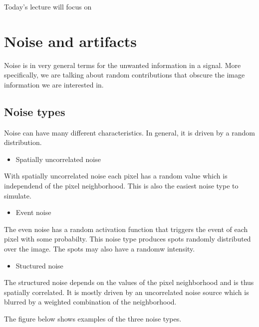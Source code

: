 \documentclass[letterpaper,10pt,english]{sphinxmanual}
\begin{document}
\sphinxAtStartPar
Today’s lecture will focus on 


\chapter{Noise and artifacts}
\label{\detokenize{02-ImageEnhancement:noise-and-artifacts}}
\sphinxAtStartPar
Noise is in very general terms for the unwanted information in a signal. More specifically, we are talking about random contributions that obscure the image information we are interested in.


\section{Noise types}
\label{\detokenize{02-ImageEnhancement:noise-types}}
\sphinxAtStartPar
Noise can have many different characteristics. In general, it is driven by a random distribution.
\begin{itemize}
\item {} 
\sphinxAtStartPar
Spatially uncorrelated noise

\end{itemize}

\sphinxAtStartPar
With spatially uncorrelated noise each pixel has a random value which is independend of the pixel neighborhood. This is also the easiest noise type to simulate.
\begin{itemize}
\item {} 
\sphinxAtStartPar
Event noise

\end{itemize}

\sphinxAtStartPar
The even noise has a random activation function that triggers the event of each pixel with some probabilty. This noise type produces spots randomly distributed over the image. The spots may also have a randomw intensity.
\begin{itemize}
\item {} 
\sphinxAtStartPar
Stuctured noise

\end{itemize}

\sphinxAtStartPar
The structured noise depends on the values of the pixel neighborhood and is thus spatially correlated. It is mostly driven by an uncorrelated noise source which is blurred by a weighted combination of the neighborhood.

\sphinxAtStartPar
The figure below shows examples of the three noise types.
\end{document}
